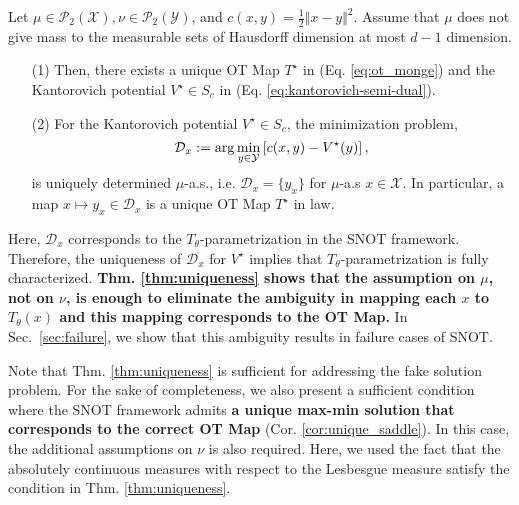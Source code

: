 \begin{theorem} \label{thm:uniqueness}
    Let $\mu \in \mathcal{P}_2(\mathcal{X}), \nu \in \mathcal{P}_2(\mathcal{Y})$, and $c(x,y)=\frac{1}{2}\Vert x-y \Vert^2$.
    Assume that $\mu$ does not give mass to the measurable sets of Hausdorff dimension at most $d-1$ dimension. 
    \begin{enumerate}[leftmargin=*, topsep=0pt, itemsep=-2pt]
        \item[(1)] 
        Then, there exists a unique OT Map $T^\star$ in (Eq. \ref{eq:ot_monge}) and the Kantorovich potential $V^\star\in S_c$ in (Eq. \ref{eq:kantorovich-semi-dual}). 
        \item[(2)]
        For the Kantorovich potential $V^\star \in S_c$, the minimization problem,
        \vspace{-10pt}
        \begin{equation} \label{eq:argmin}
            \mathcal{D}_x := \arg\min_{y\in \mathcal{Y}} \left[ c(x,y) - V^\star(y) \right],
            \vspace{-5pt}
        \end{equation}
        is uniquely determined $\mu$-a.s., i.e. $\mathcal{D}_x = \{ y_x\}$ for $\mu$-a.s $x \in \mathcal{X}$. In particular, a map $x\mapsto y_x \in \mathcal{D}_x$ is a unique OT Map $T^\star$ in law.
    \end{enumerate}
\end{theorem}
\vspace{-5pt}
Here, $\mathcal{D}_x$ corresponds to the $T_{\theta}$-parametrization in the SNOT framework. Therefore, the uniqueness of $\mathcal{D}_x$ for $V^{\star}$ implies that $T_{\theta}$-parametrization is fully characterized. \textbf{Thm. \ref{thm:uniqueness} shows that the assumption on $\mu$, not on $\nu$, is enough to eliminate the ambiguity in mapping each $x$ to $T_{\theta}(x)$ and this mapping corresponds to the OT Map.} %
In Sec.~\ref{sec:failure}, we show that this ambiguity results in failure cases of SNOT.


Note that Thm. \ref{thm:uniqueness} is sufficient for addressing the fake solution problem. For the sake of completeness, we also present a sufficient condition where the SNOT framework admits \textbf{a unique max-min solution that corresponds to the correct OT Map} (Cor. \ref{cor:unique_saddle}). In this case, the additional assumptions on $\nu$ is also required. Here, we used the fact that the absolutely continuous measures with respect to the Lesbesgue measure satisfy the condition in Thm. \ref{thm:uniqueness}. 

